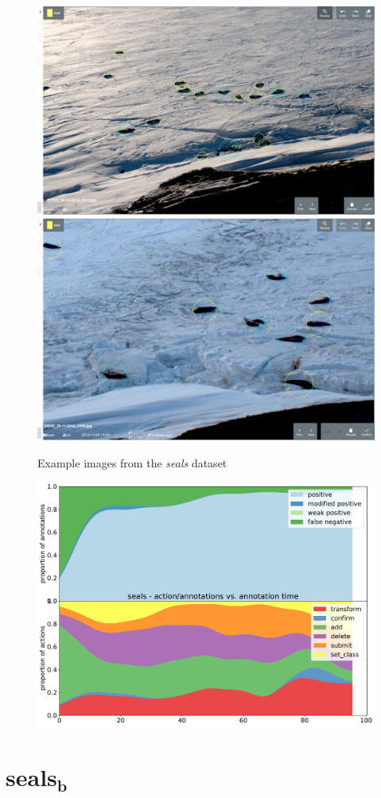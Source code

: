 \begin{figure}[!h]
\centering
  \includegraphics[width=0.475\linewidth]{figures/annotation/screenshots/seals_small2.png}
  \hfill
  \includegraphics[width=0.45\linewidth]{figures/annotation/screenshots/seals_big.png}
  \caption{}
\caption{ Example images from the \emph{seals} dataset}
\label {fig:seals_examples}
\end{figure}

\begin{figure}[!h]
\centering
\includegraphics[width=1.0\linewidth]{charts/action_annotations/seals.pdf}
\caption{  }
\label{fig:seals_annotation}
\end{figure}

\pagebreak
\section {$\mathbf{seals_b}$}
\label{sec:seals2_details}

